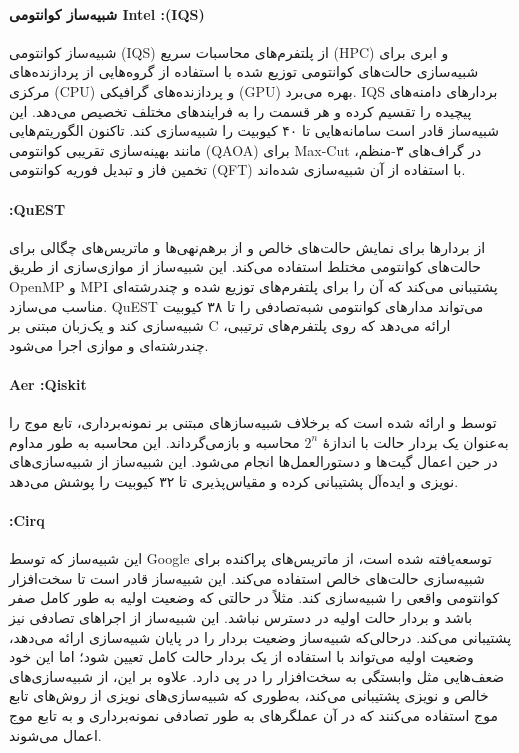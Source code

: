 \paragraph{شبیه‌ساز کوانتومی Intel :(IQS)}
شبیه‌ساز کوانتومی  (IQS) از پلتفرم‌های محاسبات سریع (HPC) و ابری برای شبیه‌سازی حالت‌های کوانتومی توزیع شده با استفاده از گروه‌هایی از پردازنده‌های مرکزی (CPU) و پردازنده‌های گرافیکی (GPU) بهره می‌برد. IQS بردارهای دامنه‌های پیچیده را تقسیم کرده و هر قسمت را به فرایندهای مختلف تخصیص می‌دهد. این شبیه‌ساز قادر است سامانه‌هایی تا ۴۰ کیوبیت را شبیه‌سازی کند. تاکنون الگوریتم‌هایی مانند بهینه‌سازی تقریبی کوانتومی (QAOA) برای Max-Cut در گراف‌های ۳-منظم، تخمین فاز و تبدیل فوریه کوانتومی (QFT) با استفاده از آن شبیه‌سازی شده‌اند.
 
 \paragraph{:QuEST}
از بردارها برای نمایش حالت‌های خالص و از برهم‌نهی‌ها و ماتریس‌های چگالی برای حالت‌های کوانتومی مختلط استفاده می‌کند. این شبیه‌ساز از موازی‌سازی از طریق OpenMP و MPI پشتیبانی می‌کند که آن را برای پلتفرم‌های توزیع شده و چندرشته‌ای مناسب می‌سازد. QuEST می‌تواند مدارهای کوانتومی شبه‌تصادفی را تا ۳۸ کیوبیت شبیه‌سازی کند و یک‌زبان مبتنی بر C ارائه می‌دهد که روی پلتفرم‌های ترتیبی، چندرشته‌ای و موازی اجرا می‌شود.
 
 \paragraph{Aer :Qiskit}
توسط
و
ارائه شده است که برخلاف شبیه‌سازهای مبتنی بر نمونه‌برداری، تابع موج را به‌عنوان یک بردار حالت با اندازهٔ $2^n$ محاسبه و بازمی‌گرداند. این محاسبه به طور مداوم در حین اعمال گیت‌ها و دستورالعمل‌ها انجام می‌شود. این شبیه‌ساز از شبیه‌سازی‌های نویزی و ایده‌آل پشتیبانی کرده و مقیاس‌پذیری تا ۳۲ کیوبیت را پوشش می‌دهد.
 
 \paragraph{:Cirq}
این شبیه‌ساز که توسط Google توسعه‌یافته شده است، از ماتریس‌های پراکنده برای شبیه‌سازی حالت‌های خالص استفاده می‌کند. این شبیه‌ساز قادر است تا سخت‌افزار کوانتومی واقعی را شبیه‌سازی کند. مثلاً در حالتی که وضعیت اولیه به طور کامل صفر باشد و بردار حالت اولیه در دسترس نباشد. این شبیه‌ساز از اجراهای تصادفی نیز پشتیبانی می‌کند. درحالی‌که شبیه‌ساز وضعیت بردار را در پایان شبیه‌سازی ارائه می‌دهد، وضعیت اولیه می‌تواند با استفاده از یک بردار حالت کامل تعیین شود؛ اما این خود ضعف‌هایی مثل وابستگی به سخت‌افزار را در پی دارد. علاوه بر این، از شبیه‌سازی‌های خالص و نویزی پشتیبانی می‌کند، به‌طوری که شبیه‌سازی‌های نویزی از روش‌های تابع موج  استفاده می‌کنند که در آن عملگرهای  به طور تصادفی نمونه‌برداری و به تابع موج اعمال می‌شوند.

